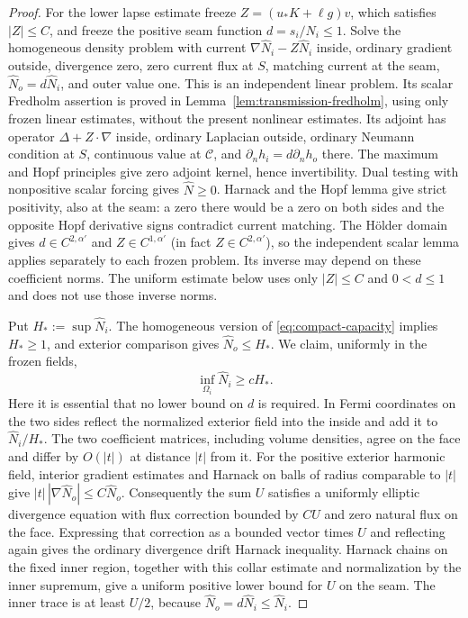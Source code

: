 \begin{proof}
For the lower lapse estimate freeze
$Z=(u_*K+\ell g)v$, which satisfies $|Z|\le C$, and freeze the positive
seam function $d=s_i/N_i\le1$. Solve the homogeneous density problem
with current $\nabla\widehat N_i-Z\widehat N_i$ inside, ordinary
gradient outside, divergence zero, zero current flux at $S$, matching
current at the seam, $\widehat N_o=d\widehat N_i$, and outer value one.
This is an independent linear problem. Its scalar Fredholm assertion
is proved in Lemma~\ref{lem:transmission-fredholm}, using only frozen
linear estimates, without the present nonlinear estimates. Its adjoint
has operator $\Delta+Z\cdot\nabla$ inside, ordinary Laplacian outside,
ordinary Neumann condition at $S$, continuous value at $\mathcal C$,
and $\partial_n h_i=d\partial_n h_o$ there. The maximum and Hopf
principles give zero adjoint kernel, hence invertibility. Dual testing
with nonpositive scalar forcing gives $\widehat N\ge0$. Harnack and
the Hopf lemma give strict positivity, also at the seam: a zero there
would be a zero on both sides and the opposite Hopf derivative signs
contradict current matching. The H\"older domain gives
$d\in C^{2,\alpha'}$ and $Z\in C^{1,\alpha'}$ (in fact
$Z\in C^{2,\alpha'}$), so the independent scalar lemma applies
separately to each frozen problem. Its inverse may depend on these
coefficient norms. The uniform estimate below uses only $|Z|\le C$
and $0<d\le1$ and does not use those inverse norms.

Put $H_*:=\sup\widehat N_i$. The homogeneous version of
\eqref{eq:compact-capacity} implies $H_*\ge1$, and exterior comparison
gives $\widehat N_o\le H_*$. We claim, uniformly in the frozen fields,
\begin{equation}\label{eq:compact-homogeneous-harnack}
 \inf_{\Omega_i}\widehat N_i\ge cH_*.
\end{equation}
Here it is essential that no lower bound on $d$ is required. In Fermi
coordinates on the two sides reflect the normalized exterior field
into the inside and add it to $\widehat N_i/H_*$. The two coefficient
matrices, including volume densities, agree on the face and differ by
$O(|t|)$ at distance $|t|$ from it. For the positive exterior harmonic
field, interior gradient estimates and Harnack on balls of radius
comparable to $|t|$ give
$|t|\,|\nabla\widehat N_o|\le C\widehat N_o$.
Consequently the sum $U$ satisfies a uniformly elliptic divergence
equation with flux correction bounded by $CU$ and zero natural flux
on the face. Expressing that correction as a bounded vector times $U$
and reflecting again gives the ordinary divergence drift Harnack
inequality. Harnack chains on the fixed inner region, together with
this collar estimate and normalization by the inner supremum, give a
uniform positive lower bound for $U$ on the seam. The inner trace is
at least $U/2$, because $\widehat N_o=d\widehat N_i\le\widehat N_i$.


\end{proof}
